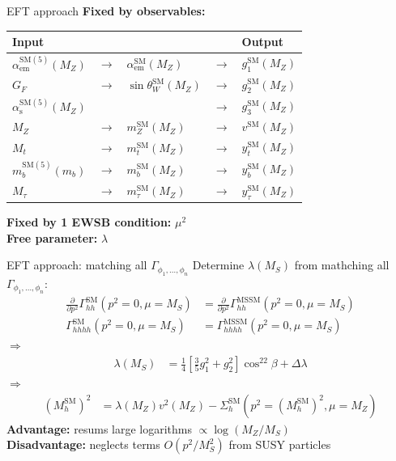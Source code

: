 \documentclass[hyperref={pdfpagelabels=false},ngerman]{beamer}
\renewcommand{\emph}{\textbf}
\newcommand{\SM}{\ensuremath{\text{SM}}}
\begin{document}
\begin{frame}{EFT approach}
  \emph{Fixed by observables:}
  \begin{table}
    \centering
    \begin{tabular}{lllll}
      Input & & & & Output \\
      \midrule
      $\alpha_\text{em}^{\SM(5)}(M_Z)$ & $\rightarrow$ & $\alpha_\text{em}^\SM(M_Z)$ & $\rightarrow$ & $g_1^\SM(M_Z)$ \\
      $G_F$ & $\rightarrow$ & $\sin\theta_W^\SM(M_Z)$ & $\rightarrow$ & $g_2^\SM(M_Z)$ \\
      $\alpha_\text{s}^{\SM(5)}(M_Z)$ & & & $\rightarrow$ & $g_3^\SM(M_Z)$ \\
      $M_Z$ & $\rightarrow$ & $m_Z^\SM(M_Z)$ & $\rightarrow$ & $v^\SM(M_Z)$ \\
      $M_t$ & $\rightarrow$ & $m_t^\SM(M_Z)$ & $\rightarrow$ & $y_t^\SM(M_Z)$ \\
      $m_b^{\SM(5)}(m_b)$ & $\rightarrow$ & $m_b^\SM(M_Z)$ & $\rightarrow$ & $y_b^\SM(M_Z)$ \\
      $M_\tau$ & $\rightarrow$ & $m_\tau^\SM(M_Z)$ & $\rightarrow$ & $y_\tau^\SM(M_Z)$ \\
    \end{tabular}
  \end{table}
  \emph{Fixed by 1 EWSB condition:} $\mu^2$ \\[1em]
  \emph{Free parameter:} $\lambda$
\end{frame}

\begin{frame}{EFT approach: matching all $\Gamma_{\phi_1,\ldots,\phi_n}$}
  Determine $\lambda(M_S)$ from mathching all $\Gamma_{\phi_1,\ldots,\phi_n}$:
  \begin{align*}
    \frac{\partial}{\partial p^2}\Gamma_{hh}^{\SM}(p^2 = 0, \mu = M_S) &= \frac{\partial}{\partial p^2}\Gamma_{hh}^\text{MSSM}(p^2 = 0, \mu = M_S) \\
    \Gamma_{hhhh}^{\SM}(p^2 = 0, \mu = M_S) &= \Gamma_{hhhh}^\text{MSSM}(p^2 = 0, \mu = M_S)
  \end{align*}
  $\Rightarrow$
  \begin{align*}
    \lambda (M_S) &= \frac{1}{4}\left[\frac{3}{5} g_1^{2} + g_2^2\right] \cos^22\beta
    + \Delta \lambda
  \end{align*}
  $\Rightarrow$
  \begin{align*}
    (M_h^\SM)^2 &= \lambda(M_Z) v^2(M_Z) - \Sigma^\SM_h(p^2 = (M_h^\SM)^2,\mu =
    M_Z)
  \end{align*}
  \emph{Advantage:} resums large logarithms $\propto\log(M_Z/M_S)$\\
  \emph{Disadvantage:} neglects terms $O(p^2/M_S^2)$ from SUSY particles
\end{frame}
\end{document}
